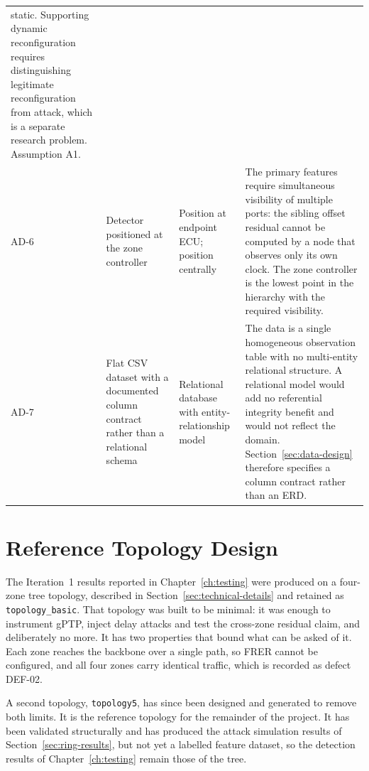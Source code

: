 \begin{longtable}{p{} p{} p{} p{}}
static. Supporting dynamic reconfiguration requires distinguishing legitimate
reconfiguration from attack, which is a separate research problem. Assumption A1. \\
\addlinespace
AD-6 & Detector positioned at the zone controller &
Position at endpoint ECU; position centrally &
The primary features require simultaneous visibility of multiple ports: the sibling
offset residual cannot be computed by a node that observes only its own clock. The
zone controller is the lowest point in the hierarchy with the required visibility. \\
\addlinespace
AD-7 & Flat CSV dataset with a documented column contract rather than a relational
schema &
Relational database with entity-relationship model &
The data is a single homogeneous observation table with no multi-entity relational
structure. A relational model would add no referential integrity benefit and would
not reflect the domain. Section~\ref{sec:data-design} therefore specifies a column contract rather than
an ERD. \\
\bottomrule
\end{longtable}

\section{Reference Topology Design}
\label{sec:ref-topology}

The Iteration~1 results reported in Chapter~\ref{ch:testing} were produced on a four-zone tree
topology, described in Section~\ref{sec:technical-details} and retained as \texttt{topology\_basic}. That
topology was built to be minimal: it was enough to instrument gPTP, inject delay
attacks and test the cross-zone residual claim, and deliberately no more. It has two
properties that bound what can be asked of it. Each zone reaches the backbone over a
single path, so FRER cannot be configured, and all four zones carry identical traffic,
which is recorded as defect DEF-02.

A second topology, \texttt{topology5}, has since been designed and generated to remove
both limits. It is the reference topology for the remainder of the project. It has
been validated structurally and has produced the attack simulation results of
Section~\ref{sec:ring-results}, but not yet a labelled feature dataset, so the detection
results of Chapter~\ref{ch:testing} remain those of the tree.

